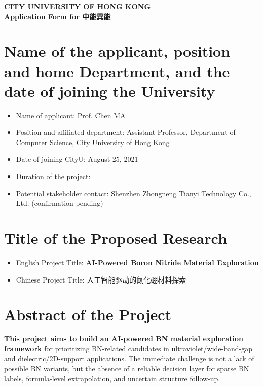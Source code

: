 \documentclass[10pt,a4paper]{article}
\newcommand{\blank}[1][7em]{\colorbox{yellow!35}{\rule{0pt}{1.05em}\hspace{#1}}}
\begin{document}
\vspace*{-44pt}
\begin{center}
    \textbf{CITY UNIVERSITY OF HONG KONG}\\
    \vspace{8pt}
    \underline{\textbf{Application Form for 中能異能}}\\
\end{center}

\section{Name of the applicant, position and home Department, and the date of joining the University}
\begin{itemize}[leftmargin=15pt]
    \vspace{-5pt}
    \item Name of applicant: Prof. Chen MA
    \vspace{-5pt}
    \item Position and affiliated department: Assistant Professor, Department of Computer Science, City University of Hong Kong
    \vspace{-5pt}
    \item Date of joining CityU: August 25, 2021
    \vspace{-5pt}
    \item Duration of the project: \blank[12em]
    \vspace{-5pt}
    \item Potential stakeholder contact: Shenzhen Zhongneng Tianyi Technology Co., Ltd. (confirmation pending)
\end{itemize}

\vspace{-10pt}
\section{Title of the Proposed Research}
\begin{itemize}[leftmargin=15pt]
    \vspace{-5pt}
    \item English Project Title: \textbf{AI-Powered Boron Nitride Material Exploration}
    \vspace{-5pt}
    \item Chinese Project Title: 人工智能驱动的氮化硼材料探索
\end{itemize}

\vspace{-10pt}
\section{Abstract of the Project}
\vspace{-5pt}
\textbf{This project aims to build an AI-powered BN material exploration framework} for prioritizing BN-related candidates in ultraviolet/wide-band-gap and dielectric/2D-support applications. The immediate challenge is not a lack of possible BN variants, but the absence of a reliable decision layer for sparse BN labels, formula-level extrapolation, and uncertain structure follow-up.
\end{document}
